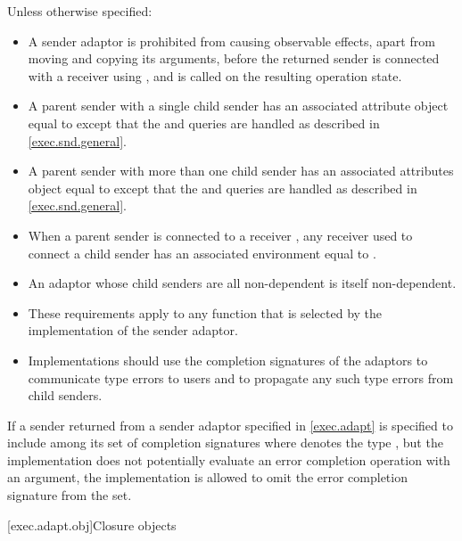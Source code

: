 \pnum
Unless otherwise specified:
\begin{itemize}
\item
A sender adaptor is prohibited from causing observable effects,
apart from moving and copying its arguments,
before the returned sender is connected with a receiver using ,
and  is called on the resulting operation state.
\item
A parent sender with a single child sender  has
an associated attribute object equal to
except that the
 and
queries are handled as described in \ref{exec.snd.general}.
\item
A parent sender with more than one child sender has
an associated attributes object equal to 
except that the
 and
queries are handled as described in \ref{exec.snd.general}.
\item
When a parent sender is connected to a receiver ,
any receiver used to connect a child sender has
an associated environment equal to .
\item
An adaptor whose child senders are all non-dependent
is itself non-dependent.
\item
These requirements apply to any function
that is selected by the implementation of the sender adaptor.
\item
 \recommended
Implementations should use
the completion signatures of the adaptors
to communicate type errors to users and
to propagate any such type errors from child senders.
\end{itemize}

\pnum
If a sender returned from a sender adaptor specified in \ref{exec.adapt}
is specified to include 
among its set of completion signatures
where  denotes the type ,
but the implementation does not potentially evaluate
an error completion operation with an  argument,
the implementation is allowed to omit
the  error completion signature from the set.

[exec.adapt.obj]{Closure objects}

